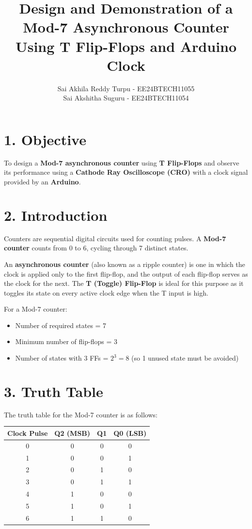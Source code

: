\documentclass[a4paper,12pt]{article}
\title{\textbf{Design and Demonstration of a Mod-7 Asynchronous Counter Using T Flip-Flops and Arduino Clock}}
\author{Sai Akhila Reddy Turpu - EE24BTECH11055\\Sai Akshitha Suguru - EE24BTECH11054}
\date{}
\begin{document}
\maketitle

\section*{1. Objective}
To design a \textbf{Mod-7 asynchronous counter} using \textbf{T Flip-Flops} and observe its performance using a \textbf{Cathode Ray Oscilloscope (CRO)} with a clock signal provided by an \textbf{Arduino}.

\section*{2. Introduction}
Counters are sequential digital circuits used for counting pulses. A \textbf{Mod-7 counter} counts from 0 to 6, cycling through 7 distinct states. 

An \textbf{asynchronous counter} (also known as a ripple counter) is one in which the clock is applied only to the first flip-flop, and the output of each flip-flop serves as the clock for the next. The \textbf{T (Toggle) Flip-Flop} is ideal for this purpose as it toggles its state on every active clock edge when the T input is high.

For a Mod-7 counter:
\begin{itemize}
    \item Number of required states = 7
    \item Minimum number of flip-flops = $3$
    \item Number of states with 3 FFs = $2^3 = 8$ (so 1 unused state must be avoided)
\end{itemize}



\section*{3. Truth Table}
The truth table for the Mod-7 counter is as follows:

\begin{center}
\begin{tabular}{|c|c|c|c|}
\hline
Clock Pulse & Q2 (MSB) & Q1 & Q0 (LSB) \\
\hline
0 & 0 & 0 & 0 \\
1 & 0 & 0 & 1 \\
2 & 0 & 1 & 0 \\
3 & 0 & 1 & 1 \\
4 & 1 & 0 & 0 \\
5 & 1 & 0 & 1 \\
6 & 1 & 1 & 0 \\
\hline
\end{tabular}
\end{center}
\end{document}
